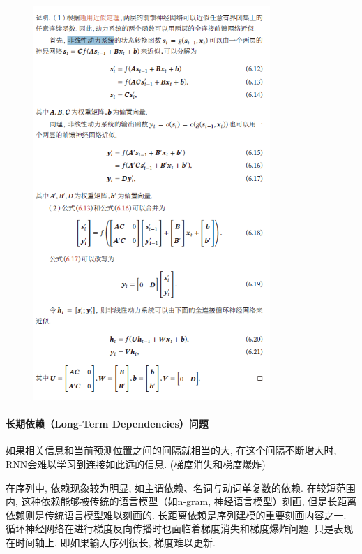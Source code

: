 \documentclass[a4paper]{article}
\theoremstyle{definition}
\numberwithin{equation}{section}
\begin{document}
\begin{figure}[!htb]
    \center
\includegraphics[width=0.8\textwidth]{RNN_univesal.png}
\end{figure}





 \paragraph{长期依赖（Long-Term Dependencies）问题}
如果相关信息和当前预测位置之间的间隔就相当的大, 在这个间隔不断增大时,  RNN会难以学习到连接如此远的信息. (梯度消失和梯度爆炸)

在序列中, 依赖现象较为明显, 如主谓依赖、名词与动词单复数的依赖. 在较短范围内, 这种依赖能够被传统的语言模型（如n-gram, 神经语言模型）刻画, 但是长距离依赖则是传统语言模型难以刻画的. 长距离依赖是序列建模的重要刻画内容之一.
循环神经网络在进行梯度反向传播时也面临着梯度消失和梯度爆炸问题, 只是表现在时间轴上, 即如果输入序列很长,  梯度难以更新. 
\end{document}
